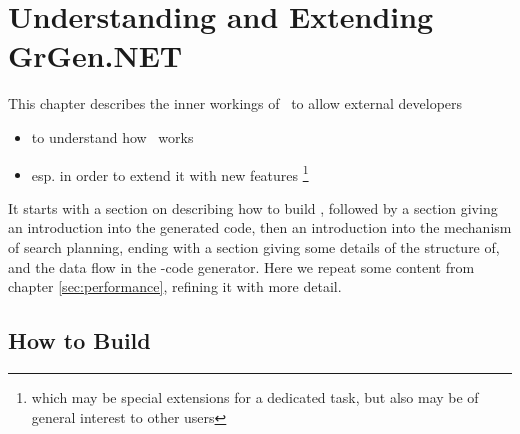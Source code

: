 \chapter{Understanding and Extending GrGen.NET} \label{cha:developing}

This chapter describes the inner workings of \GrG~to allow external developers
\begin{itemize}
\item to understand how \GrG~works
\item esp. in order to extend it with new features
\footnote{which may be special extensions for a dedicated task, but also may be of general interest to other users}
\end{itemize}
It starts with a section on describing how to build \GrG, followed by a section giving an introduction into the generated code, then an introduction into the mechanism of search planning, ending with a section giving some details of the structure of, and the data flow in the \GrG-code generator.
Here we repeat some content from chapter \ref{sec:performance}, refining it with more detail.

\section{How to Build}\label{sub:building}

